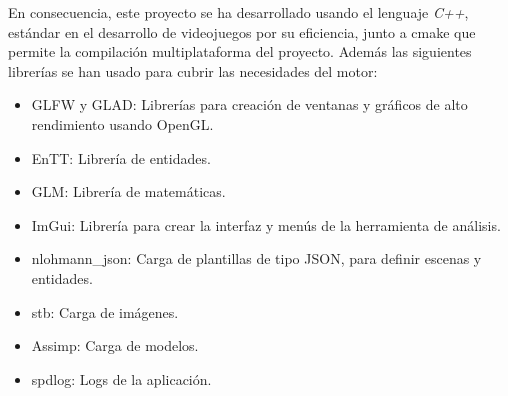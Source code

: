 En consecuencia, este proyecto se ha desarrollado usando el lenguaje \textit{C++}, estándar en el desarrollo de
videojuegos por su eficiencia, junto a cmake\cite{cmake} que permite la compilación multiplataforma del proyecto.
Además las siguientes librerías se han usado para cubrir las necesidades del motor:
\begin{itemize}
    \item GLFW\cite{glfw} y GLAD\cite{glad}: Librerías para creación de ventanas y gráficos de alto rendimiento usando OpenGL\cite{opengl}.
    \item EnTT\cite{entt}: Librería de entidades.
    \item GLM\cite{glm}: Librería de matemáticas.
    \item ImGui\cite{imgui}: Librería para crear la interfaz y menús de la herramienta de análisis.
    \item nlohmann\_json\cite{nlohmann_json}: Carga de plantillas de tipo JSON, para definir escenas y entidades.
    \item stb\cite{stb}: Carga de imágenes.
    \item Assimp\cite{assimp}: Carga de modelos.
    \item spdlog\cite{spdlog}: Logs de la aplicación.
\end{itemize}

\emptyPage